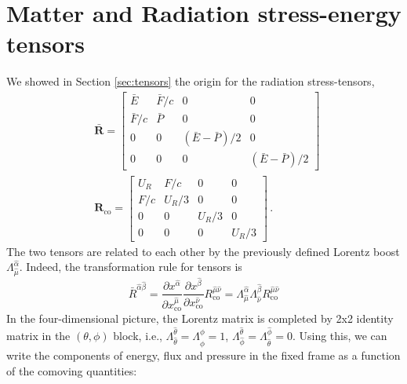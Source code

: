 \documentclass[../main.tex]{subfiles}
\begin{document}
\section*{Matter and Radiation stress-energy tensors}
We showed in Section \ref{sec:tensors} the origin for the radiation stress-tensors,
\begin{align}
&\bm{\bar{R}}=\begin{bmatrix}\bar{E} & \bar{F}/c &0&0\\\bar{F}/c &\bar{P} &0&0\\0&0&(\bar{E}-\bar{P})/2&0\\0&0&0&(\bar{E}-\bar{P})/2\end{bmatrix}\,\\
&\bm{R}_\text{co}=\begin{bmatrix}U_R & F/c&0&0\\F/c&U_R/3&0&0\\0&0&U_R/3&0\\0&0&0&U_R/3\end{bmatrix}\,.
\end{align}
The two tensors are related to each other by the previously defined Lorentz boost $\Lambda^{\hat{\alpha}}_{\hat{\mu}}$. Indeed, the transformation rule for tensors is 
\begin{equation}
      \bar{R}^{\hat{\alpha}\hat{\beta}}=\frac{\partial x^{\hat{\alpha}}}{\partial x^{\hat{\mu}}_\text{co}}\frac{\partial x^{\hat{\beta}}}{\partial x^{\hat{\nu}}_\text{co}}R^{\hat{\mu}\hat{\nu}}_\text{co}=\Lambda^{\hat{\alpha}}_{\hat{\mu}}\Lambda^{\hat{\beta}}_{\hat{\nu}}R^{\hat{\mu}\hat{\nu}}_\text{co}
\end{equation}
In the four-dimensional picture, the Lorentz matrix is completed by 2x2 identity matrix in the $(\theta,\phi)$ block, i.e., $\Lambda^{\hat{\theta}}_{\hat{\theta}}=\Lambda^{\hat{\phi}}_{\hat{\phi}}=1$, $\Lambda^{\hat{\theta}}_{\hat{\phi}}=\Lambda^{\hat{\phi}}_{\hat{\theta}}=0$.  Using this, we can write the components of energy, flux and pressure in the fixed frame as a function of the comoving quantities:
\begingroup
\allowdisplaybreaks
\end{document}
